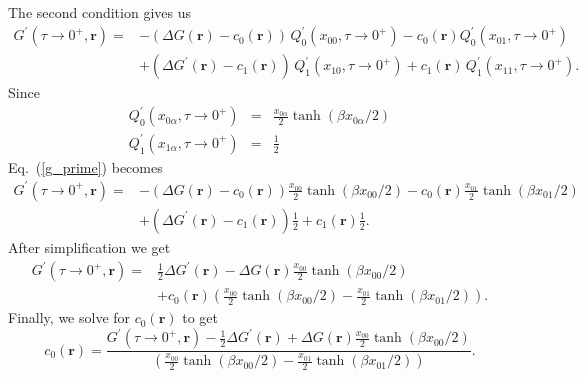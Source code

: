 The second condition gives us
\begin{equation}
\label{g_prime}
\begin{split}
G^{\prime}(\tau \to 0^+, \mathbf{r}) = &
- (\Delta G(\mathbf{r}) - c_0(\mathbf{r})) 
\,Q_0^{\prime}(x_{00},\tau \to 0^+)
 - c_0(\mathbf{r}) Q_0^{\prime}(x_{01}, \tau \to 0^+) \\
& +  (\Delta G^{\prime}(\mathbf{r}) - c_1(\mathbf{r})) 
\,Q_1^{\prime}(x_{10},\tau \to 0^+)
+ c_1(\mathbf{r}) \,Q_1^{\prime}(x_{11},\tau \to 0^+).
\end{split}
\end{equation}
Since
\begin{eqnarray}
Q_0^{\prime}(x_{0\alpha},\tau \to 0^+) & = & \frac{x_{0\alpha}}{2}
\tanh(\beta x_{0\alpha}/2) \\
Q_1^{\prime}(x_{1\alpha},\tau \to 0^+) & = & \frac{1}{2}
\end{eqnarray}
Eq.~(\ref{g_prime}) becomes
\begin{equation}
\begin{split}
G^{\prime}(\tau \to 0^+, \mathbf{r}) = &
- (\Delta G(\mathbf{r}) - c_0(\mathbf{r})) \frac{x_{00}}{2} 
\tanh(\beta x_{00}/2) - c_0(\mathbf{r}) \frac{x_{01}}{2} 
\tanh(\beta x_{01}/2) \\
& +  (\Delta G^{\prime}(\mathbf{r}) - c_1(\mathbf{r}))\frac{1}{2}
+ c_1(\mathbf{r})\frac{1}{2}.
\end{split}
\end{equation}
After simplification we get
\begin{equation}
\begin{split}
G^{\prime}(\tau \to 0^+, \mathbf{r}) = &
\frac{1}{2}\Delta G^{\prime}(\mathbf{r}) -
 \Delta G(\mathbf{r}) \frac{x_{00}}{2} 
\tanh(\beta x_{00}/2) \\
& + c_0(\mathbf{r}) \left(\frac{x_{00}}{2} \tanh(\beta x_{00}/2)
- \frac{x_{01}}{2} \tanh(\beta x_{01}/2) \right).
\end{split}
\end{equation}
Finally, we solve for $c_0(\mathbf{r})$ to get
\begin{equation}
c_0(\mathbf{r}) = \frac{ G^{\prime}(\tau \to 0^+, \mathbf{r}) -
\frac{1}{2}\Delta G^{\prime}(\mathbf{r}) +
 \Delta G(\mathbf{r}) \frac{x_{00}}{2} 
\tanh(\beta x_{00}/2) }
{\left(\frac{x_{00}}{2} \tanh(\beta x_{00}/2)
- \frac{x_{01}}{2} \tanh(\beta x_{01}/2) \right)}.
\end{equation}

